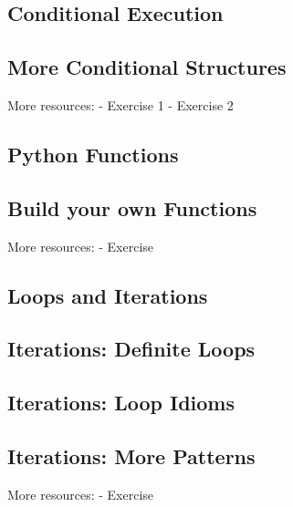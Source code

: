 \documentclass{article}%
\begin{document}
%
\subsection{Conditional Execution}%
\label{subsec:ConditionalExecution}%

%
\subsection{More Conditional Structures}%
\label{subsec:MoreConditionalStructures}%
More resources:\newline%
{-} Exercise 1\newline%
{-} Exercise 2\newline%

%
\subsection{Python Functions}%
\label{subsec:PythonFunctions}%

%
\subsection{Build your own Functions}%
\label{subsec:BuildyourownFunctions}%
More resources:\newline%
{-} Exercise\newline%

%
\subsection{Loops and Iterations}%
\label{subsec:LoopsandIterations}%

%
\subsection{Iterations: Definite Loops}%
\label{subsec:IterationsDefiniteLoops}%

%
\subsection{Iterations: Loop Idioms}%
\label{subsec:IterationsLoopIdioms}%

%
\subsection{Iterations: More Patterns}%
\label{subsec:IterationsMorePatterns}%
More resources:\newline%
{-} Exercise\newline%
\end{document}
